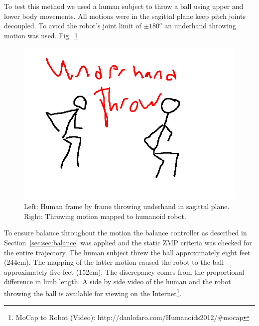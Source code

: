 To test this method we used a human subject to throw a ball using upper and lower body movements.  
All motions were in the sagittal plane keep pitch joints decoupled.  
To avoid the robot's joint limit of $\pm180^o$ an underhand throwing motion was used.
Fig.~\ref{fig:mocap-underhand}

\begin{figure}[t]
  \centering
\includegraphics[width=1.0\columnwidth]{./pix/mocap-Underhand-throw.png}
  \caption{Left: Human frame by frame throwing underhand in sagittal plane.  Right: Throwing motion mapped to humanoid robot.}
  \label{fig:mocap-underhand}
\end{figure}

To ensure balance throughout the motion the balance controller as described in Section~\ref{sec:sec:balance} was applied and the static ZMP criteria was checked for the entire trajectory.
The human subject threw the ball approximately eight feet (244cm).  
The mapping of the latter motion caused the robot to the ball approximately five feet (152cm).
The discrepancy comes from the proportional difference in limb length.
A side by side video of the human and the robot throwing the ball is available for viewing on the Internet\footnote{MoCap to Robot (Video): http://danlofaro.com/Humanoids2012/\#mocap}.





